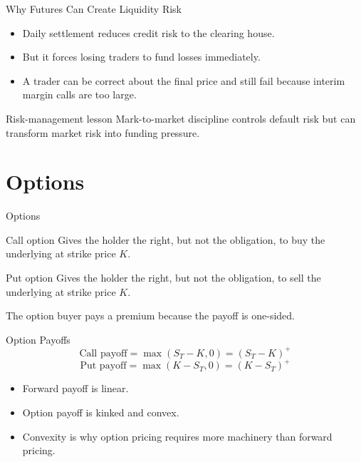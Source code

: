 \documentclass[aspectratio=169,11pt]{beamer}
\begin{document}
\begin{frame}{Why Futures Can Create Liquidity Risk}
    \begin{itemize}
        \item Daily settlement reduces credit risk to the clearing house.
        \item But it forces losing traders to fund losses immediately.
        \item A trader can be correct about the final price and still fail because interim margin calls are too large.
    \end{itemize}

    \begin{alertblock}{Risk-management lesson}
        Mark-to-market discipline controls default risk but can transform market risk into funding pressure.
    \end{alertblock}
\end{frame}

\section{Options}

\begin{frame}{Options}
    \begin{block}{Call option}
        Gives the holder the right, but not the obligation, to buy the underlying at strike price $K$.
    \end{block}

    \begin{block}{Put option}
        Gives the holder the right, but not the obligation, to sell the underlying at strike price $K$.
    \end{block}

    The option buyer pays a premium because the payoff is one-sided.
\end{frame}

\begin{frame}{Option Payoffs}
    \[
        \text{Call payoff} = \max(S_T-K,0)=(S_T-K)^+
    \]
    \[
        \text{Put payoff} = \max(K-S_T,0)=(K-S_T)^+
    \]

    \begin{itemize}
        \item Forward payoff is linear.
        \item Option payoff is kinked and convex.
        \item Convexity is why option pricing requires more machinery than forward pricing.
    \end{itemize}
\end{frame}
\end{document}
